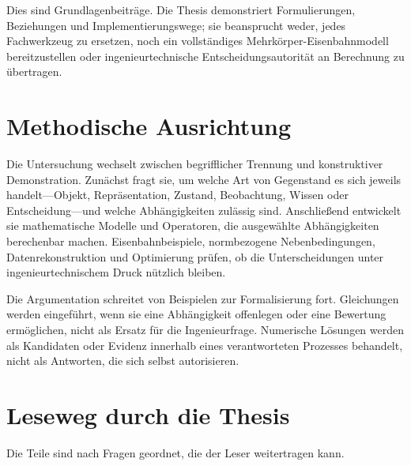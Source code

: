 Dies sind Grundlagenbeiträge. Die Thesis demonstriert Formulierungen,
Beziehungen und Implementierungswege; sie beansprucht weder, jedes
Fachwerkzeug zu ersetzen, noch ein vollständiges
Mehrkörper-Eisenbahnmodell bereitzustellen oder ingenieurtechnische
Entscheidungsautorität an Berechnung zu übertragen.

\section{Methodische Ausrichtung}

Die Untersuchung wechselt zwischen begrifflicher Trennung und konstruktiver
Demonstration. Zunächst fragt sie, um welche Art von Gegenstand es sich jeweils
handelt---Objekt, Repräsentation, Zustand, Beobachtung, Wissen oder
Entscheidung---und welche Abhängigkeiten zulässig sind. Anschließend entwickelt
sie mathematische Modelle und Operatoren, die ausgewählte Abhängigkeiten
berechenbar machen. Eisenbahnbeispiele, normbezogene Nebenbedingungen,
Datenrekonstruktion und Optimierung prüfen, ob die Unterscheidungen unter
ingenieurtechnischem Druck nützlich bleiben.

Die Argumentation schreitet von Beispielen zur Formalisierung fort.
Gleichungen werden eingeführt, wenn sie eine Abhängigkeit offenlegen oder eine
Bewertung ermöglichen, nicht als Ersatz für die Ingenieurfrage. Numerische
Lösungen werden als Kandidaten oder Evidenz innerhalb eines verantworteten
Prozesses behandelt, nicht als Antworten, die sich selbst autorisieren.

\section{Leseweg durch die Thesis}

Die Teile sind nach Fragen geordnet, die der Leser weitertragen kann.

